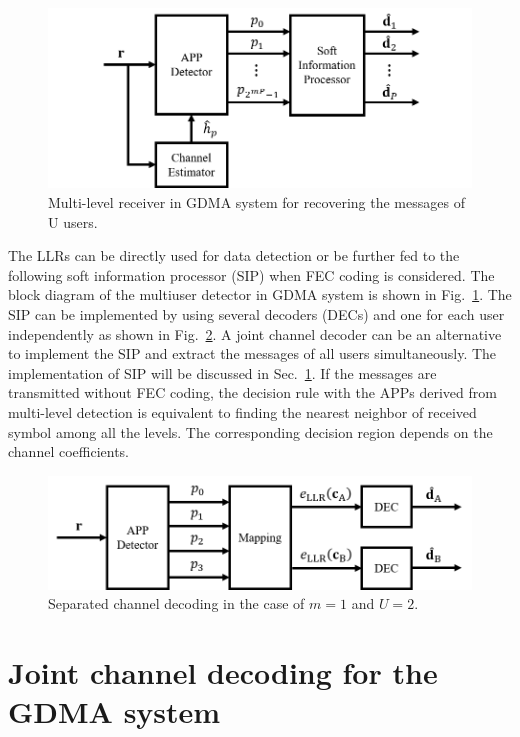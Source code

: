 \begin{figure}[H]
 \centering
 \includegraphics[width=15cm]{fig/gdma_rx.png}
 \caption{Multi-level receiver in GDMA system for recovering the messages of U users.}
 \label{fig:gdma_rx}
\end{figure}


The LLRs can be directly used for data detection or be further fed to the following soft information processor (SIP) when FEC coding is considered. The block diagram of the multiuser detector in GDMA system is shown in Fig.~\ref{fig:gdma_rx}. The SIP can be implemented by using several decoders (DECs) and one for each user independently as shown in Fig.~\ref{fig:gdma_scd}. A joint channel decoder can be an alternative to implement the SIP and extract the messages of all users simultaneously. The implementation of SIP will be discussed in Sec.~\ref{s:mldt_fec}. 
If the messages are transmitted without FEC coding, the decision rule with the APPs derived from multi-level detection is equivalent to finding the nearest neighbor of received symbol among all the levels. The corresponding decision region depends on the channel coefficients.

\begin{figure}[H]
 \centering
 \includegraphics[width=15cm]{fig/gdma_scd.png}
 \caption{Separated channel decoding in the case of $m=1$ and $U=2$.}
 \label{fig:gdma_scd}
\end{figure}

\section{Joint channel decoding for the GDMA system}
\label{s:mldt_fec}

